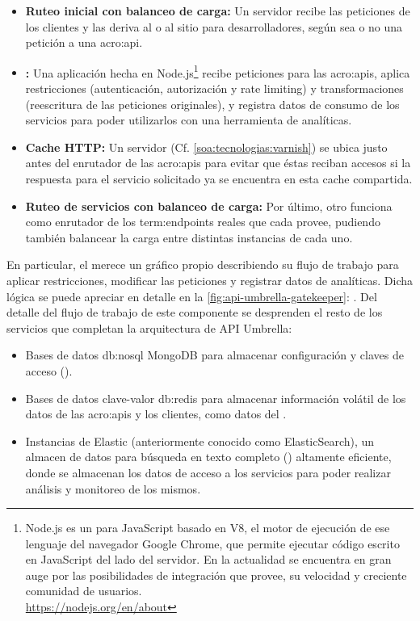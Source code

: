 \begin{itemize}
  \item \textbf{Ruteo inicial con balanceo de carga:} Un servidor  recibe las peticiones de los clientes y las deriva al  o al sitio para desarrolladores, según sea o no una petición a una \gls{acro:api}.
  \item \textbf{:} Una aplicación hecha en Node.js\footnote{Node.js es un  para JavaScript basado en V8, el motor de ejecución de ese lenguaje del navegador Google Chrome, que permite ejecutar código escrito en JavaScript del lado del servidor. En la actualidad se encuentra en gran auge por las posibilidades de integración que provee, su velocidad y creciente comunidad de usuarios.\\\url{https://nodejs.org/en/about}} recibe peticiones para las \glspl{acro:api}, aplica restricciones (autenticación, autorización y rate limiting) y transformaciones (reescritura de las peticiones originales), y registra datos de consumo de los servicios para poder utilizarlos con una herramienta de analíticas.
  \item \textbf{Cache HTTP:} Un servidor  (Cf. \autoref{soa:tecnologias:varnish}) se ubica justo antes del enrutador de las \glspl{acro:api} para evitar que éstas reciban accesos si la respuesta para el servicio solicitado ya se encuentra en esta cache compartida.
  \item \textbf{Ruteo de servicios con balanceo de carga:} Por último, otro  funciona como enrutador de los \glspl{term:endpoint} reales que cada  provee, pudiendo también balancear la carga entre distintas instancias de cada uno.
\end{itemize}

En particular, el  merece un gráfico propio describiendo su flujo de trabajo para aplicar restricciones, modificar las peticiones y registrar datos de analíticas. Dicha lógica se puede apreciar en detalle en la \autoref{fig:api-umbrella-gatekeeper}: . Del detalle del flujo de trabajo de este componente se desprenden el resto de los servicios que completan la arquitectura de API Umbrella:

\begin{itemize}
  \item Bases de datos \gls{db:nosql} MongoDB para almacenar configuración y claves de acceso ().
  \item Bases de datos clave-valor \gls{db:redis} para almacenar información volátil de los datos de las \glspl{acro:api} y los clientes, como datos del .
  \item Instancias de Elastic (anteriormente conocido como ElasticSearch), un almacen de datos para búsqueda en texto completo () altamente eficiente, donde se almacenan los datos de acceso a los servicios para poder realizar análisis y monitoreo de los mismos.
\end{itemize}

